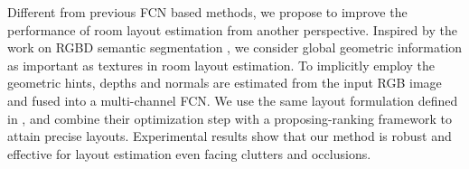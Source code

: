 Different from previous FCN based methods, we propose to improve the performance of room layout estimation from another perspective. 
Inspired by the work on RGBD semantic segmentation \cite{gupta2014learning,couprie2013indoor,li2017semantics,pagnutti2017segmentation,qi20173d}, we consider global geometric information as important as textures in room layout estimation. 
To implicitly employ the geometric hints, depths and normals are estimated from the input RGB image and fused into a multi-channel FCN. We use the same layout formulation defined in \cite{dasgupta2016delay}, and combine their optimization step with a proposing-ranking framework to attain precise layouts. 
Experimental results show that our method is robust and effective for layout estimation even facing clutters and occlusions.
 





